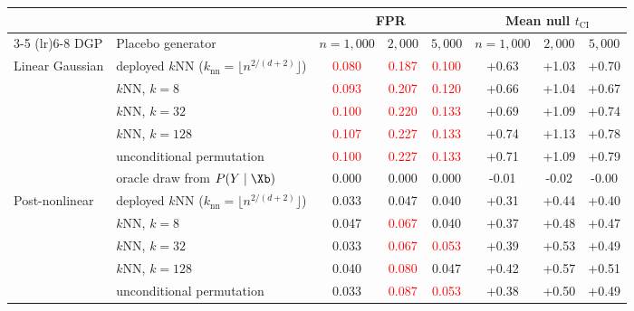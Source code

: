 \begin{tabular}{llcccccc}
    \toprule
     & & \multicolumn{3}{c}{FPR} & \multicolumn{3}{c}{Mean null $t_{\mathrm{CI}}$} \\
    \cmidrule(lr){3-5} \cmidrule(lr){6-8}
    DGP & Placebo generator & $n{=}1{,}000$ & $2{,}000$ & $5{,}000$ & $n{=}1{,}000$ & $2{,}000$ & $5{,}000$ \\
    \midrule
    Linear Gaussian    & deployed $k$NN ($k_{\mathrm{nn}} = \lfloor n^{2/(d+2)} \rfloor$) & \textcolor{red}{0.080} & \textcolor{red}{0.187} & \textcolor{red}{0.100} & +0.63 & +1.03 & +0.70 \\
                       & $k$NN, $k{=}8$                                       & \textcolor{red}{0.093} & \textcolor{red}{0.207} & \textcolor{red}{0.120} & +0.66 & +1.04 & +0.67 \\
                       & $k$NN, $k{=}32$                                      & \textcolor{red}{0.100} & \textcolor{red}{0.220} & \textcolor{red}{0.133} & +0.69 & +1.09 & +0.74 \\
                       & $k$NN, $k{=}128$                                     & \textcolor{red}{0.107} & \textcolor{red}{0.227} & \textcolor{red}{0.133} & +0.74 & +1.13 & +0.78 \\
                       & unconditional permutation                            & \textcolor{red}{0.100} & \textcolor{red}{0.227} & \textcolor{red}{0.133} & +0.71 & +1.09 & +0.79 \\
                       & oracle draw from $P(Y \mid \Xb)$                     & 0.000 & 0.000 & 0.000 & -0.01 & -0.02 & -0.00 \\
    \midrule
    Post-nonlinear     & deployed $k$NN ($k_{\mathrm{nn}} = \lfloor n^{2/(d+2)} \rfloor$) & 0.033 & 0.047 & 0.040 & +0.31 & +0.44 & +0.40 \\
                       & $k$NN, $k{=}8$                                       & 0.047 & \textcolor{red}{0.067} & 0.040 & +0.37 & +0.48 & +0.47 \\
                       & $k$NN, $k{=}32$                                      & 0.033 & \textcolor{red}{0.067} & \textcolor{red}{0.053} & +0.39 & +0.53 & +0.49 \\
                       & $k$NN, $k{=}128$                                     & 0.040 & \textcolor{red}{0.080} & 0.047 & +0.42 & +0.57 & +0.51 \\
                       & unconditional permutation                            & 0.033 & \textcolor{red}{0.087} & \textcolor{red}{0.053} & +0.38 & +0.50 & +0.49 \\

\end{tabular}
